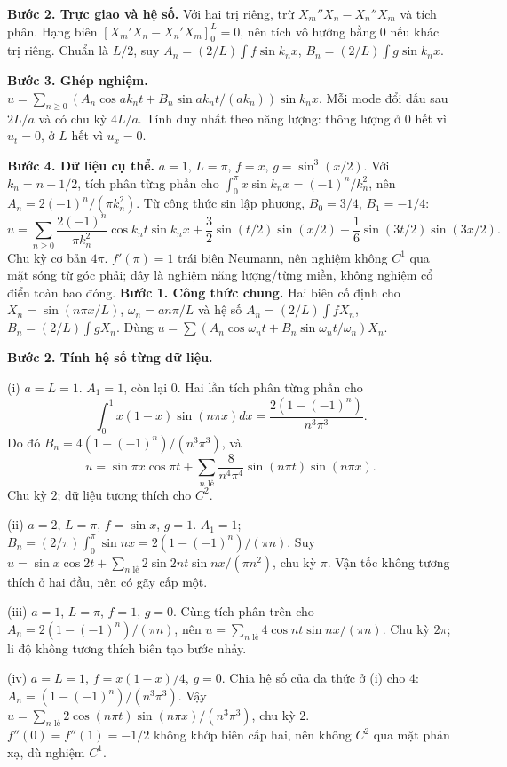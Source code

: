 \textbf{Bước 2. Trực giao và hệ số.} Với hai trị riêng, trừ $X_m''X_n-X_n''X_m$ và tích phân. Hạng biên $[X_m'X_n-X_n'X_m]_0^L=0$, nên tích vô hướng bằng $0$ nếu khác trị riêng. Chuẩn là $L/2$, suy $A_n=(2/L)\int f\sin k_nx$, $B_n=(2/L)\int g\sin k_nx$.

\textbf{Bước 3. Ghép nghiệm.} $u=\sum_{n\ge0}(A_n\cos ak_nt+B_n\sin ak_nt/(ak_n))\sin k_nx$. Mỗi mode đổi dấu sau $2L/a$ và có chu kỳ $4L/a$. Tính duy nhất theo năng lượng: thông lượng ở $0$ hết vì $u_t=0$, ở $L$ hết vì $u_x=0$.

\textbf{Bước 4. Dữ liệu cụ thể.} $a=1$, $L=\pi$, $f=x$, $g=\sin^3(x/2)$. Với $k_n=n+1/2$, tích phân từng phần cho $\int_0^\pi x\sin k_nx=(-1)^n/k_n^2$, nên $A_n=2(-1)^n/(\pi k_n^2)$. Từ công thức sin lập phương, $B_0=3/4$, $B_1=-1/4$:
\[u=\sum_{n\ge0}\frac{2(-1)^n}{\pi k_n^2}\cos k_nt\sin k_nx
+\frac32\sin(t/2)\sin(x/2)-\frac16\sin(3t/2)\sin(3x/2).\]
Chu kỳ cơ bản $4\pi$. $f'(\pi)=1$ trái biên Neumann, nên nghiệm không $C^1$ qua mặt sóng từ góc phải; đây là nghiệm năng lượng/từng miền, không nghiệm cổ điển toàn bao đóng.
\textbf{Bước 1. Công thức chung.} Hai biên cố định cho $X_n=\sin(n\pi x/L)$, $\omega_n=an\pi/L$ và hệ số $A_n=(2/L)\int fX_n$, $B_n=(2/L)\int gX_n$. Dùng $u=\sum(A_n\cos\omega_nt+B_n\sin\omega_nt/\omega_n)X_n$.

\textbf{Bước 2. Tính hệ số từng dữ liệu.}

(i) $a=L=1$. $A_1=1$, còn lại $0$. Hai lần tích phân từng phần cho
\[\int_0^1x(1-x)\sin(n\pi x)dx=\frac{2(1-(-1)^n)}{n^3\pi^3}.\]
Do đó $B_n=4(1-(-1)^n)/(n^3\pi^3)$, và
\[u=\sin\pi x\cos\pi t+\sum_{n\text{ lẻ}}\frac8{n^4\pi^4}\sin(n\pi t)\sin(n\pi x).\]
Chu kỳ $2$; dữ liệu tương thích cho $C^2$.

(ii) $a=2$, $L=\pi$, $f=\sin x$, $g=1$. $A_1=1$; $B_n=(2/\pi)\int_0^\pi\sin nx=2(1-(-1)^n)/(\pi n)$. Suy $u=\sin x\cos2t+\sum_{n\text{ lẻ}}2\sin2nt\sin nx/(\pi n^2)$, chu kỳ $\pi$. Vận tốc không tương thích ở hai đầu, nên có gãy cấp một.

(iii) $a=1$, $L=\pi$, $f=1$, $g=0$. Cùng tích phân trên cho $A_n=2(1-(-1)^n)/(\pi n)$, nên $u=\sum_{n\text{ lẻ}}4\cos nt\sin nx/(\pi n)$. Chu kỳ $2\pi$; li độ không tương thích biên tạo bước nhảy.

(iv) $a=L=1$, $f=x(1-x)/4$, $g=0$. Chia hệ số của đa thức ở (i) cho $4$: $A_n=(1-(-1)^n)/(n^3\pi^3)$. Vậy $u=\sum_{n\text{ lẻ}}2\cos(n\pi t)\sin(n\pi x)/(n^3\pi^3)$, chu kỳ $2$. $f''(0)=f''(1)=-1/2$ không khớp biên cấp hai, nên không $C^2$ qua mặt phản xạ, dù nghiệm $C^1$.

